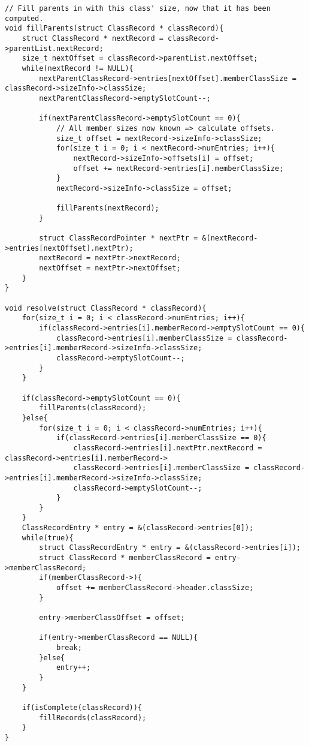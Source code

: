 \documentclass{article}
\begin{document}
\begin{verbatim}
// Fill parents in with this class' size, now that it has been computed.
void fillParents(struct ClassRecord * classRecord){
    struct ClassRecord * nextRecord = classRecord->parentList.nextRecord;
    size_t nextOffset = classRecord->parentList.nextOffset;
    while(nextRecord != NULL){
    	nextParentClassRecord->entries[nextOffset].memberClassSize = classRecord->sizeInfo->classSize;
        nextParentClassRecord->emptySlotCount--;
        
        if(nextParentClassRecord->emptySlotCount == 0){
            // All member sizes now known => calculate offsets.
            size_t offset = nextRecord->sizeInfo->classSize;
            for(size_t i = 0; i < nextRecord->numEntries; i++){
                nextRecord->sizeInfo->offsets[i] = offset;
                offset += nextRecord->entries[i].memberClassSize;
            }
            nextRecord->sizeInfo->classSize = offset;
            
            fillParents(nextRecord);
        }
        
        struct ClassRecordPointer * nextPtr = &(nextRecord->entries[nextOffset].nextPtr);
        nextRecord = nextPtr->nextRecord;
        nextOffset = nextPtr->nextOffset;
    }
}

void resolve(struct ClassRecord * classRecord){
    for(size_t i = 0; i < classRecord->numEntries; i++){
        if(classRecord->entries[i].memberRecord->emptySlotCount == 0){
            classRecord->entries[i].memberClassSize = classRecord->entries[i].memberRecord->sizeInfo->classSize;
            classRecord->emptySlotCount--;
        }
    }
    
    if(classRecord->emptySlotCount == 0){
        fillParents(classRecord);
    }else{
        for(size_t i = 0; i < classRecord->numEntries; i++){
            if(classRecord->entries[i].memberClassSize == 0){
            	classRecord->entries[i].nextPtr.nextRecord = classRecord->entries[i].memberRecord->
                classRecord->entries[i].memberClassSize = classRecord->entries[i].memberRecord->sizeInfo->classSize;
                classRecord->emptySlotCount--;
            }
        }
    }
    ClassRecordEntry * entry = &(classRecord->entries[0]);
    while(true){
    	struct ClassRecordEntry * entry = &(classRecord->entries[i]);
        struct ClassRecord * memberClassRecord = entry->memberClassRecord;
        if(memberClassRecord->){
            offset += memberClassRecord->header.classSize;
        }
        
        entry->memberClassOffset = offset;
        
        if(entry->memberClassRecord == NULL){
            break;
        }else{
            entry++;
        }
    }
    
    if(isComplete(classRecord)){
        fillRecords(classRecord);
    }
}
\end{verbatim}
\end{document}
